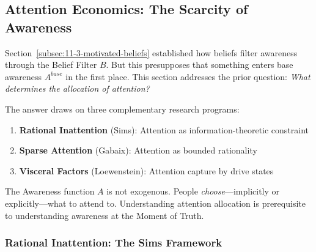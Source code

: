 \subsection{Attention Economics: The Scarcity of Awareness}
\label{subsec:11-4-attention-economics}


Section~\ref{subsec:11-3-motivated-beliefs} established how beliefs filter 
awareness through the Belief Filter $B$. But this presupposes that something 
enters base awareness $A^{base}$ in the first place. This section addresses 
the prior question: \emph{What determines the allocation of attention?}

The answer draws on three complementary research programs:
\begin{enumerate}
\item \textbf{Rational Inattention} (Sims): Attention as information-theoretic constraint
\item \textbf{Sparse Attention} (Gabaix): Attention as bounded rationality
\item \textbf{Visceral Factors} (Loewenstein): Attention capture by drive states
\end{enumerate}

\begin{tcolorbox}[colback=red!5!white, colframe=red!75!black, title=Why This Section Matters]
The Awareness function $A$ is not exogenous. People \emph{choose}---implicitly 
or explicitly---what to attend to. Understanding attention allocation is 
prerequisite to understanding awareness at the Moment of Truth.
\end{tcolorbox}

\subsubsection{Rational Inattention: The Sims Framework}
\label{subsubsec:rational-inattention}

